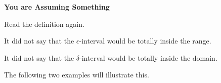 \documentclass{ximera}
\begin{document}
\begin{warning} \textbf{\textcolor{red!70!black}{You are Assuming Something}}

Read the definition again. 

It did not say that the $\epsilon$-interval would be totally inside the range. 

It did not say that the $\delta$-interval would be totally inside the domain. 

\end{warning}


The following two examples will illustrate this.
\end{document}
